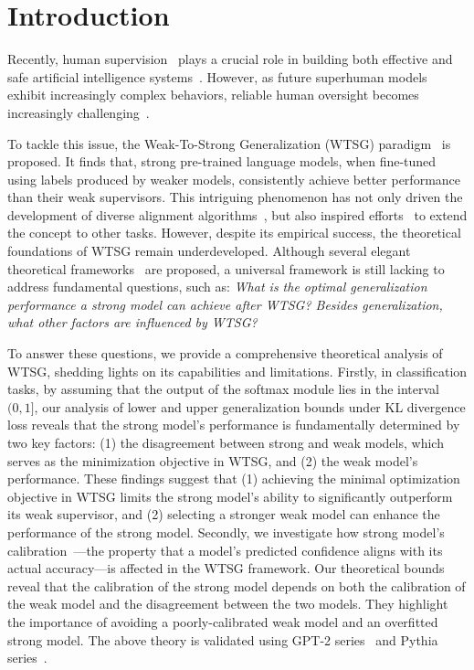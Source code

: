 \section{Introduction}

Recently, human supervision~\citep{ouyang2022training,bai2022training} plays a crucial role in building both effective and safe artificial intelligence systems~\citep{achiam2023gpt,touvron2023llama}.
However, as future superhuman models exhibit increasingly complex behaviors, reliable human oversight becomes increasingly challenging~\citep{openai_superalignment}.



To tackle this issue, the Weak-To-Strong Generalization (WTSG) paradigm~\citep{burns2023weak} is proposed.
It finds that, strong pre-trained language models, when fine-tuned using labels produced by weaker models, consistently achieve better performance than their weak supervisors.
This intriguing phenomenon has not only driven the development of diverse alignment algorithms~\citep{zhu2024weak,liu2024co}, but also inspired efforts~\citep{pawelczyk2024generalizing,yang-etal-2024-weak,guo2024vision} to extend the concept to other tasks.
However, despite its empirical success, the theoretical foundations of WTSG remain underdeveloped.
Although several elegant theoretical frameworks~\citep{lang2024theoretical,somerstep2024statistical,wu2024provable,charikar2024quantifying} are proposed, a universal framework is still lacking to address fundamental questions, such as: \textit{What is the optimal generalization performance a strong model can achieve after WTSG? Besides generalization, what other factors are influenced by WTSG?}



To answer these questions, we provide a comprehensive theoretical analysis of WTSG, shedding lights on its capabilities and limitations.
Firstly, in classification tasks, by assuming that the output of the softmax module lies in the interval $(0,1]$, our analysis of lower and upper generalization bounds under KL divergence loss reveals that the strong model's performance is fundamentally determined by two key factors:
(1) the disagreement between strong and weak models, which serves as the minimization objective in WTSG, and (2) the weak model's performance.
These findings suggest that (1) achieving the minimal optimization objective in WTSG limits the strong model’s ability to significantly outperform its weak supervisor, and (2) selecting a stronger weak model can enhance the performance of the strong model.
Secondly, we investigate how strong model's calibration~\citep{guo2017calibration,kumar2019verified}—the property that a model's predicted confidence aligns with its actual accuracy—is affected in the WTSG framework.
Our theoretical bounds reveal that the calibration of the strong model depends on both the calibration of the weak model and the disagreement between the two models.
They highlight the importance of avoiding a poorly-calibrated weak model and an overfitted strong model.
The above theory is validated using GPT-2 series~\citep{radford2019language} and Pythia series~\citep{biderman2023pythia}.


